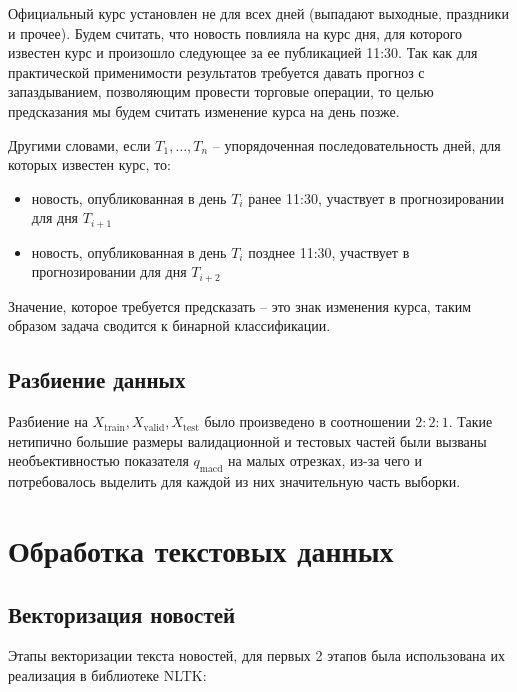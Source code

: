 \documentclass[14pt,a4paper]{extreport}
\begin{document}
Официальный курс установлен не для всех дней (выпадают выходные, праздники и прочее).
Будем считать, что новость повлияла на курс дня, для которого известен курс и произошло следующее за ее публикацией 11:30.
Так как для практической применимости результатов требуется давать прогноз с запаздыванием, позволяющим провести торговые операции,
то целью предсказания мы будем считать изменение курса на день позже.

Другими словами, если $T_1,\ldots,T_n$ -- упорядоченная последовательность дней, для которых известен курс, то:
\begin{itemize}
\item новость, опубликованная в день $T_i$ ранее 11:30, участвует в прогнозировании для дня $T_{i+1}$
\item новость, опубликованная в день $T_i$ позднее 11:30, участвует в прогнозировании для дня $T_{i+2}$
\end{itemize}

Значение, которое требуется предсказать -- это знак изменения курса, таким образом задача сводится к бинарной классификации.

\subsection{Разбиение данных}

Разбиение на $X_\text{train}, X_\text{valid}, X_\text{test}$ было произведено в соотношении $2:2:1$.
Такие нетипично большие размеры валидационной и тестовых частей были вызваны необъективностью показателя
$q_\text{macd}$ на малых отрезках, из-за чего и потребовалось выделить для каждой из них значительную часть выборки.

\section{Обработка текстовых данных}

\subsection{Векторизация новостей}

Этапы векторизации текста новостей, для первых 2 этапов была использована их реализация в библиотеке NLTK\cite{nltk}:
\end{document}
